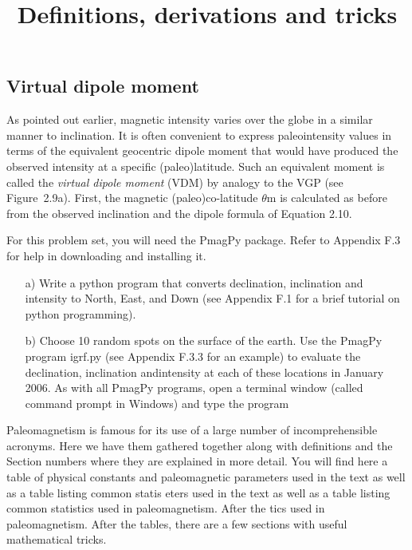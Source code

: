 \documentclass[draft,plain]{tauxe}
\begin{document}
\setcounter{subsection}{2}

\subsection{Virtual dipole moment}

As pointed out earlier, magnetic intensity varies over the globe in a similar manner to inclination.
It is often convenient to express paleointensity values in terms of the equivalent geocentric dipole
moment that would have produced the observed intensity at a specific (paleo)latitude. Such an
equivalent moment is called the {\it  virtual dipole moment} (VDM) by analogy to the VGP (see Figure~2.9a). First, the magnetic (paleo)co-latitude $\theta$m is calculated as before from the observed inclination
and the dipole formula of Equation 2.10.

\begin{problem}
For this problem set, you will need the PmagPy package. Refer to Appendix F.3 for
help in downloading and installing it.


\begin{enumerate}
\item[a)] Write a python program that converts declination, inclination and intensity to North,\break
East, and Down (see Appendix F.1 for a brief tutorial on python programming).

\item[b)] Choose 10 random spots on the surface of the earth. Use the PmagPy program\break
igrf.py (see Appendix F.3.3 for an example) to evaluate the declination, inclination and\break intensity at each of these locations in January 2006. As with all PmagPy programs,\break
open a terminal window (called command prompt in Windows) and type the program
\end{enumerate}
\end{problem}

\backmatter

\appendix

\title{Definitions, derivations and tricks}

\maketitle

Paleomagnetism is famous for its use of a large number of incomprehensible acronyms. Here we
have them gathered together along with definitions and the Section numbers where they are explained
in more detail. You will find here a table of physical constants and paleomagnetic parameters
used in the text as well as a table listing common statis eters used in the text as well as a table
listing common statistics used in paleomagnetism. After the tics used in paleomagnetism. After the
tables, there are a few sections with useful mathematical tricks.
\end{document}
